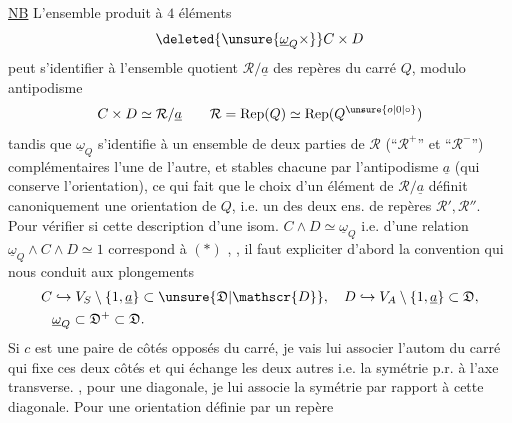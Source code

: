 \uline{NB} L'ensemble produit à $4$ éléments
\[
\deleted{\unsure{\underline\omega_Q\times}}C\times D
\]
peut s'identifier à l'ensemble quotient $\mathcal{R}/\underline a$ des repères du carré $Q$, modulo antipodisme
\[
C\times D\simeq \mathcal{R}/\underline a\qquad \mathcal{R}=\mathrm{Rep}(Q)\simeq\mathrm{Rep}(Q^{\unsure{o|0|\circ}})
\]
tandis que $\underline\omega_Q$ s'identifie à  un ensemble de deux parties de $\mathcal{R}$ (``$\mathcal{R}^+$'' et ``$\mathcal{R}^-$'') complémentaires l'une de l'autre, et stables chacune par l'antipodisme $\underline a$ (qui conserve l'orientation), ce qui fait que le choix d'un élément de $\mathcal{R}/\underline a$ définit canoniquement une orientation de $Q$,  i.e. un des deux  ens. de repères $\mathcal{R}',\mathcal{R}''$. Pour vérifier  si cette description d'une isom. $C\wedge D\simeq\underline\omega_Q$ i.e. d'une relation $\underline\omega_Q\wedge C\wedge D\simeq1$ correspond à $(*)$ , , il faut expliciter d'abord la convention qui nous  conduit aux plongements
\[
\begin{aligned}
C&\hookrightarrow V_S\setminus\{1,\underline a\}\subset\unsure{\mathfrak{D}|\mathscr{D}},\quad D\hookrightarrow V_A\setminus\{1,\underline a\}\subset\mathfrak{D},\\
&\underline\omega_Q\subset\mathfrak{D}^+\subset\mathfrak{D}.
\end{aligned}
\]
Si $c$ est une  paire de côtés opposés du carré, je vais lui associer l'autom  du carré qui fixe ces deux côtés et qui échange les deux autres i.e. la symétrie p.r. à l'axe transverse. , pour une diagonale, je lui associe la symétrie par rapport à cette diagonale. Pour une orientation définie par un repère 
